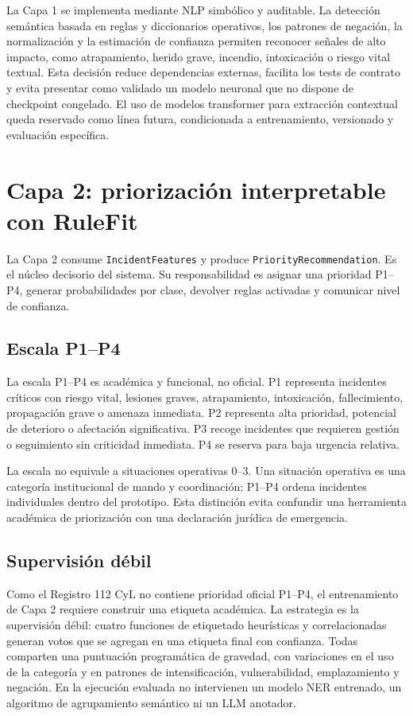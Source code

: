 La Capa 1 se implementa mediante NLP simbólico y auditable. La detección semántica
basada en reglas y diccionarios operativos, los patrones de negación, la normalización
y la estimación de confianza permiten reconocer señales de alto impacto, como
atrapamiento, herido grave, incendio, intoxicación o riesgo vital textual. Esta
decisión reduce dependencias externas,
facilita los tests de contrato y evita presentar como validado un modelo neuronal que
no dispone de checkpoint congelado. El uso de modelos transformer para extracción
contextual queda reservado como línea futura, condicionada a entrenamiento, versionado
y evaluación específica.

\section{Capa 2: priorización interpretable con RuleFit}

La Capa 2 consume \texttt{IncidentFeatures} y produce \texttt{PriorityRecommendation}. Es el núcleo decisorio del sistema. Su responsabilidad es asignar una prioridad P1--P4, generar probabilidades por clase, devolver reglas activadas y comunicar nivel de confianza.

\subsection{Escala P1--P4}

La escala P1--P4 es académica y funcional, no oficial. P1 representa incidentes críticos con riesgo vital, lesiones graves, atrapamiento, intoxicación, fallecimiento, propagación grave o amenaza inmediata. P2 representa alta prioridad, potencial de deterioro o afectación significativa. P3 recoge incidentes que requieren gestión o seguimiento sin criticidad inmediata. P4 se reserva para baja urgencia relativa.

La escala no equivale a situaciones operativas 0--3. Una situación operativa es una categoría institucional de mando y coordinación; P1--P4 ordena incidentes individuales dentro del prototipo. Esta distinción evita confundir una herramienta académica de priorización con una declaración jurídica de emergencia.

\subsection{Supervisión débil}

Como el Registro 112 CyL no contiene prioridad oficial P1--P4, el entrenamiento de Capa 2 requiere construir una etiqueta académica. La estrategia es la supervisión débil: cuatro funciones de etiquetado heurísticas y correlacionadas generan votos que se agregan en una etiqueta final con confianza. Todas comparten una puntuación programática de gravedad, con variaciones en el uso de la categoría y en patrones de intensificación, vulnerabilidad, emplazamiento y negación. En la ejecución evaluada no intervienen un modelo NER entrenado, un algoritmo de agrupamiento semántico ni un LLM anotador.

